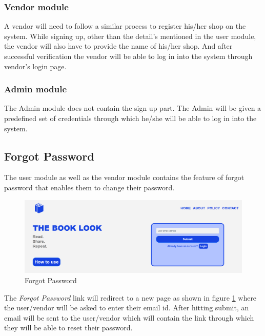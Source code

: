 \documentclass[conference]{IEEEtran}
\begin{document}
\subsubsection{Vendor module}
A vendor will need to follow a similar process to register his/her shop on the system. While signing up, other than the detail's mentioned in the user module, the vendor will also have to provide the name of his/her shop. And after successful verification the vendor will be able to log in into the system through vendor's login page.
\vspace{3mm}
\subsubsection{Admin module}
The Admin module does not contain the sign up part. The Admin will be given a predefined set of credentials through which he/she will be able to log in into the system.

\subsection{Forgot Password}
The user module as well as the vendor module contains the feature of forgot password that enables them to change their password. 
\begin{figure}[h]
     \centering
     \includegraphics[scale=0.20,margin=2,frame]{forgotpassword.PNG}
     \caption{Forgot Password}
     \label{fig:forgotpassword}
 \end{figure}
The \emph{Forgot Password} link will redirect to a new page as shown in figure \ref{fig:forgotpassword} where the user/vendor will be asked to enter their email id. After hitting submit, an email will be sent to the user/vendor which will contain the link through which they will be able to reset their password.
\end{document}
